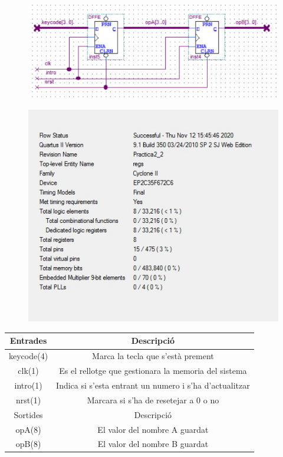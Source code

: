 \documentclass[12pt, a4papre]{article}
\begin{document}
	\begin{figure}[H]
		\begin{center}
		\includegraphics[width=130mm]{regs.png}
		\end{center}
	\end{figure}
	
	\begin{figure}[H]
		\begin{center}
		\includegraphics[width=130mm]{informeREGS.jpeg}
		\end{center}
	\end{figure}
	
	\begin{table}[h!]
		\centering
		 \begin{tabular}{|c | c|} 
			 \hline
			 Entrades & Descripció\\ [0.5ex] 
			 \hline
			 keycode(4) & Marca la tecla que s'està prement \\
			 clk(1) & Es el rellotge que gestionara la memoria del sistema\\
			 intro(1) & Indica si s'esta entrant un numero i s'ha d'actualitzar\\
			 nrst(1) & Marcara si s'ha de resetejar a 0 o no \\ [1ex] 
			 \hline\hline
			 Sortides & Descripció\\ [0.5ex] 
			 \hline
			 opA(8) & El valor del nombre A guardat\\
			 opB(8) & El valor del nombre B guardat\\
			 \hline
		 \end{tabular}
	\end{table}
	
\end{document}
